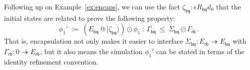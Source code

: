 \documentclass[acmsmall,nonacm]{acmart}
\newcommand{\kw}[1]{\ensuremath{ \mathsf{#1} }}
\newcommand{\vcomp}{\fatsemi}
\newcommand{\sepconj}{\oast}
\newcommand{\emptysig}{0}
\newcommand{\mathbbm}[1]{\mathds{#1}}
\begin{document}

\begin{example} %
Following up on Example~\ref{ex:encaps},
we can use the fact $\zeta_\kw{bq} : \epsilon \mathbin{R_\kw{bq}} d_0$
that the initial states are related
to prove the following property:
\[
  \phi_1' \: := \:
  (E_\kw{bq} \mathbin@ [\zeta_\kw{bq}\rangle) \odot \phi_1
  \: : \:
  \Gamma_\kw{bq} \: \le \: \Sigma_\kw{bq} \odot \Gamma_\kw{rb}
  \,.
\]
That is, encapsulation not only makes it easier
to interface $\Sigma_\kw{bq} : E_\kw{rb} \twoheadrightarrow E_\kw{bq}$
with $\Gamma_\kw{rb} : \emptysig \twoheadrightarrow E_\kw{rb}$,
but it also means the simulation
$\phi_1'$ can be stated in terms of the identity refinement convention.


\end{example}
\end{document}
